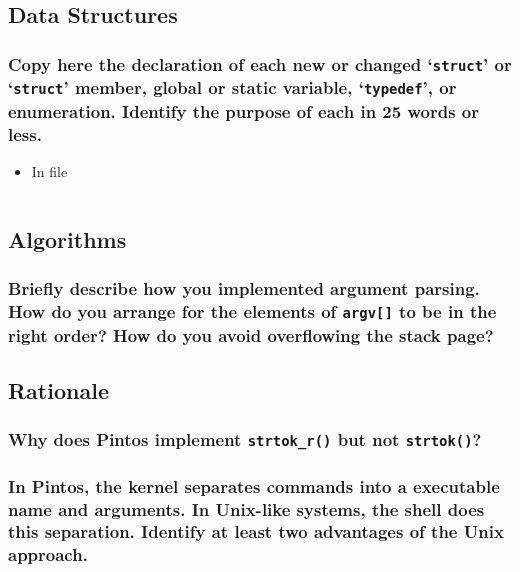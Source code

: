 \documentclass[sigconf, nonacm, balance=false, urlbreakonhyphens=true]{acmart}
\begin{document}
        \label{Argument Passing}
    
        \subsection{Data Structures}
        
            \subsubsection{Copy here the declaration of each new or changed `\texttt{struct}' or `\texttt{struct}' member, global or static variable, `\texttt{typedef}', or enumeration. Identify the purpose of each in 25 words or less. } 
            
                \begin{itemize}
                    \item In file \texttt{}
\begin{verbatim}
\end{verbatim}
                \end{itemize}
        
        \subsection{Algorithms}
        
            \subsubsection{Briefly describe how you implemented argument parsing.  How do you arrange for the elements of \texttt{argv[]} to be in the right order?  How do you avoid overflowing the stack page? }
        
        \subsection{Rationale}
            
            \subsubsection{Why does Pintos implement \texttt{strtok\_r()} but not \texttt{strtok()}?} 

            \subsubsection{In Pintos, the kernel separates commands into a executable name and arguments.  In Unix-like systems, the shell does this separation.  Identify at least two advantages of the Unix approach.} 
    
\end{document}
